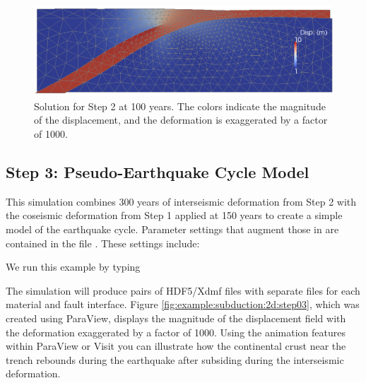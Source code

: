 \begin{figure}
  \includegraphics[width=4.5in]{examples/figs/subduction2d_step02_soln}
  \caption{Solution for Step 2 at 100 years. The colors indicate the
    magnitude of the displacement, and the deformation is exaggerated
    by a factor of 1000.}
  \label{fig:example:subduction:2d:step02}
\end{figure}


\subsection{Step 3: Pseudo-Earthquake Cycle Model}

This simulation combines 300 years of interseismic deformation from
Step 2 with the coseismic deformation from Step 1 applied at 150 years
to create a simple model of the earthquake cycle. Parameter settings
that augment those in  are contained in the
file . These settings include:
\begin{inventory}
\end{inventory}
We run this example by typing
The simulation will produce pairs of HDF5/Xdmf files with separate
files for each material and fault interface. Figure \vref{fig:example:subduction:2d:step03},
which was created using ParaView, displays the magnitude of the displacement
field with the deformation exaggerated by a factor of 1000. Using
the animation features within ParaView or Visit you can illustrate
how the continental crust near the trench rebounds during the earthquake
after subsiding during the interseismic deformation. 


